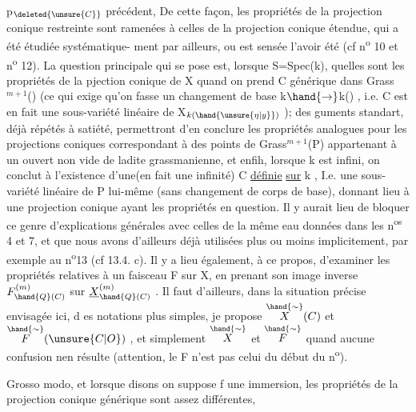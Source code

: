 
p$_{\deleted{\unsure{C}}}$ précédent, 
 De cette façon, les propriétés de
la projection conique  restreinte  sont ramenées  à
celles de la projection conique étendue, qui a été  étudiée systématique-%
ment par ailleurs, ou est sensée l'avoir été (cf n\textsuperscript{o} 10 et n\textsuperscript{o} 12). La
question principale qui se pose est, lorsque  S=Spec(k), quelles sont
les propriétés de la pjection conique  de X  quand on prend C générique
dans Grass$^{m+1}$() (ce qui exige  qu'on fasse un changement de base
k$\hand{\rightarrow}$k() , i.e.  C est  en fait une sous-variété linéaire de X$_{k(\hand{\unsure{\eta|y}})}$ ); des
guments  standart, déjà répétés à satiété, permettront d'en conclure
les propriétés analogues pour les projections coniques correspondant à 
des points de Grass$^{m+1}$(P)  appartenant à un ouvert non vide de ladite
grassmanienne, et enfih, lorsque k est infini, on conclut à l'existence
d'une(en fait une infinité)   C  \uline{définie} \uline{sur} k , I.e.  une sous-variété
linéaire de P lui-même (sans changement de corps de base), donnant lieu
à une projection conique ayant les propriétés en question. Il y aurait
\margin{|} lieu de bloquer ce genre d'explications générales avec celles de la même
eau données dans les n\textsuperscript{os} 4 et 7, et que nous avons d'ailleurs déjà
utilisées plus ou moins implicitement,  par exemple au n\textsuperscript{o}13 
 (cf 13.4. c). Il y a lieu également, à ce propos, d'examiner les
propriétés relatives à un faisceau F sur X,  en prenant son image inverse
$F^{(m)}_{\hand{Q}(C)}$  sur  $\underline{X}^{(m)}_{\hand{Q}(C)}$ . Il faut  d'ailleurs, dans la situation précise
envisagée ici, d es notations plus simples, je propose  $\overset{\hand{\sim}}{X}(C)$ et $\overset{\hand{\sim}}{F}(\unsure{C|O})$ ,
et simplement $\overset{\hand{\sim}}{X}$ et $\overset{\hand{\sim}}{F}$  quand aucune confusion nen résulte  (attention, le
F   n'est pas  celui du début du n\textsuperscript{o}).

Grosso modo, et lorsque  disons on suppose  f une immersion, les
propriétés de la projection conique générique sont assez différentes,

